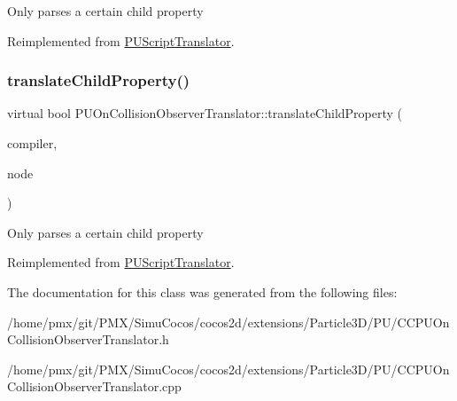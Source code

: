 Only parses a certain child property 

Reimplemented from \hyperlink{classPUScriptTranslator_a0374d83a8a04e57918975d525e0f8fe8}{P\+U\+Script\+Translator}.

\mbox{\label{classPUOnCollisionObserverTranslator_a6fa0903778981fe103e04cc9e283b5ba}} 
\subsubsection{\texorpdfstring{translate\+Child\+Property()}{translateChildProperty()}\hspace{0.1cm}{\footnotesize\ttfamily [2/2]}}
{\footnotesize\ttfamily virtual bool P\+U\+On\+Collision\+Observer\+Translator\+::translate\+Child\+Property (\begin{DoxyParamCaption}\item[{\hyperlink{classPUScriptCompiler}{P\+U\+Script\+Compiler} $\ast$}]{compiler,  }\item[{\hyperlink{classPUAbstractNode}{P\+U\+Abstract\+Node} $\ast$}]{node }\end{DoxyParamCaption})\hspace{0.3cm}{\ttfamily [virtual]}}

Only parses a certain child property 

Reimplemented from \hyperlink{classPUScriptTranslator_a0374d83a8a04e57918975d525e0f8fe8}{P\+U\+Script\+Translator}.



The documentation for this class was generated from the following files\+:\begin{DoxyCompactItemize}
\item 
/home/pmx/git/\+P\+M\+X/\+Simu\+Cocos/cocos2d/extensions/\+Particle3\+D/\+P\+U/C\+C\+P\+U\+On\+Collision\+Observer\+Translator.\+h\item 
/home/pmx/git/\+P\+M\+X/\+Simu\+Cocos/cocos2d/extensions/\+Particle3\+D/\+P\+U/C\+C\+P\+U\+On\+Collision\+Observer\+Translator.\+cpp\end{DoxyCompactItemize}
